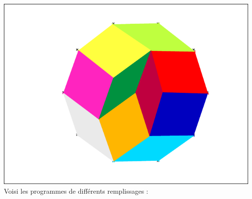 \documentclass[a4paper,11pt]{book}
\begin{document}
\includegraphics[width=\textwidth]{decac}\\
Voisi les programmes de diff\'erents remplissages :
\end{document}
